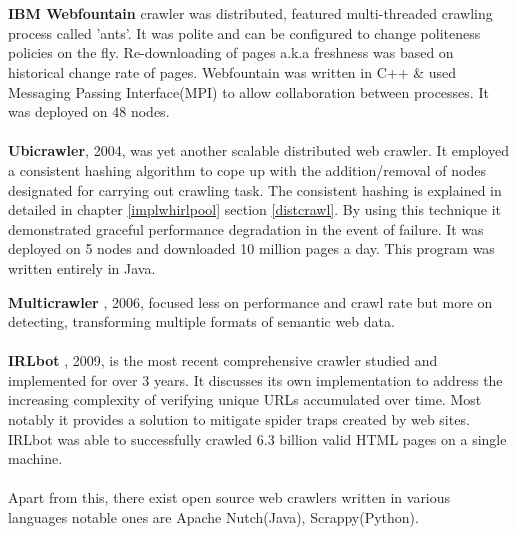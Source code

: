 \\
\\
\textbf{IBM Webfountain}\cite{ibm} crawler was distributed, featured multi-threaded crawling process called 'ants'.
It was polite and can be configured to change politeness policies on the fly. Re-downloading of pages a.k.a
freshness was based on historical change rate of pages. Webfountain was written in C++ \& used Messaging
Passing Interface(MPI) to allow collaboration between processes. It was deployed on 48 nodes.
\\
\\
\textbf{Ubicrawler}\cite{ubicrawler}, 2004, was yet another scalable distributed web crawler. It employed
a consistent hashing algorithm to cope up with the addition/removal of nodes designated for carrying out crawling task. The consistent hashing is explained in detailed in chapter \ref{implwhirlpool} section
\ref{distcrawl}. By using this technique it demonstrated graceful performance degradation in the event of
failure. It was deployed on 5 nodes and downloaded 10 million pages a day. This program was written
entirely in Java.
\\
\pagebreak

\noindent
\textbf{Multicrawler} \cite{multicrawler}, 2006, focused less on performance and crawl rate but more on
detecting, transforming multiple formats of semantic web data.
\\
\\
\textbf{IRLbot} \cite{irlbot}, 2009, is the most recent comprehensive crawler studied and implemented for
over 3 years. It discusses its own implementation to address the increasing complexity of verifying unique
URLs accumulated over time. Most notably it provides a solution to mitigate spider traps created by web sites. IRLbot was able to successfully crawled 6.3 billion valid HTML pages on a single machine.
\\
\\
Apart from this, there exist open source web crawlers written in various languages notable ones are Apache Nutch(Java), Scrappy(Python).
